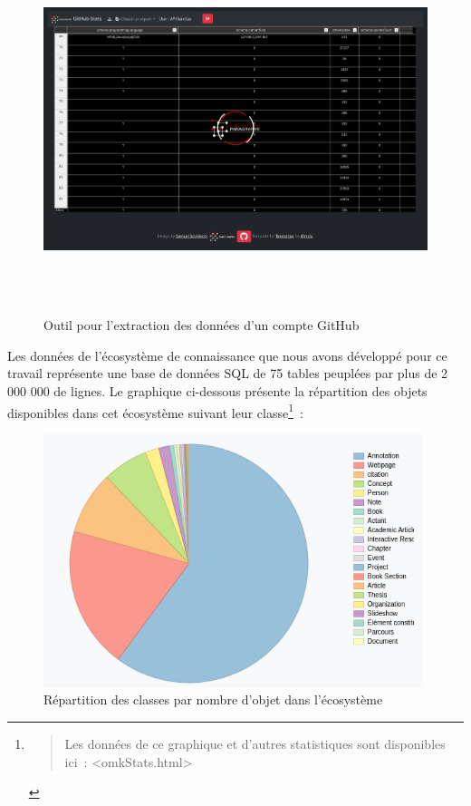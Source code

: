 \documentclass[
  letterpaper,
  DIV=11,
  numbers=noendperiod]{scrreprt}
\begin{document}
\begin{figure}

{\centering \includegraphics[width=17cm,height=10.733cm]{media/10000001000005FA000003C6E505BCF012940265.png}

}

\caption{\label{fig-outilsExtractGithub}Outil pour l'extraction des
données d'un compte GitHub}

\end{figure}

Les données de l'écosystème de connaissance que nous avons développé
pour ce travail représente une base de données SQL de 75 tables peuplées
par plus de 2 000 000 de lignes. Le graphique ci-dessous présente la
répartition des objets disponibles dans cet écosystème suivant leur
classe\footnote{\begin{quote}
  Les données de ce graphique et d'autres statistiques sont disponibles
  ici~: \textless omkStats.html\textgreater{}
  \end{quote}}~:

\begin{figure}

{\centering \includegraphics[width=11.09cm,height=7.378cm]{media/100000010000023E0000017E87A6A293BEC71C5E.png}

}

\caption{\label{fig-repartitionClass}Répartition des classes par nombre
d'objet dans l'écosystème}

\end{figure}
\end{document}
